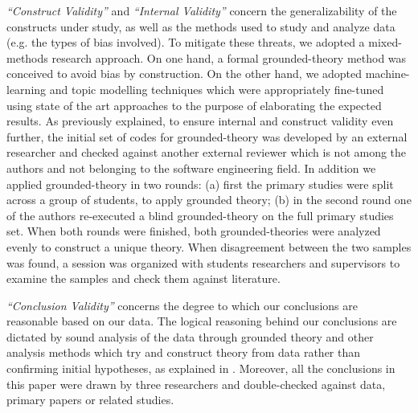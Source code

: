 \emph{``Construct Validity''} and \emph{``Internal Validity''} concern the generalizability of the constructs under study, as well as the methods used to study and analyze data (e.g. the types of bias involved). To mitigate these threats, we adopted a mixed-methods research approach. On one hand, a formal grounded-theory method was conceived to avoid bias by construction\cite{straussian,gt,gtmeth}. On the other hand, we adopted machine-learning and topic modelling techniques which were appropriately fine-tuned using state of the art approaches to the purpose of elaborating the expected results. As previously explained, to ensure internal and construct validity even further, the initial set of codes for grounded-theory was developed by an external researcher and checked against another external reviewer which is not among the authors and not belonging to the software engineering field. In addition we applied grounded-theory in two rounds: (a) first the primary studies were split across a group of students, to apply grounded theory; (b) in the second round one of the authors re-executed a blind grounded-theory on the full primary studies set. When both rounds were finished, both grounded-theories were analyzed evenly to construct a unique theory. When disagreement between the two samples was found, a session was organized with students researchers and supervisors to examine the samples and check them against literature.


\emph{``Conclusion Validity''} concerns the degree to which our conclusions are reasonable based on our data. The logical reasoning behind our conclusions are dictated by sound analysis of the data through grounded theory and other analysis methods which try and construct theory from data rather than confirming initial hypotheses, as explained in \cite{gtmeth,gtval}. Moreover, all the conclusions in this paper were drawn by three researchers and double-checked against data, primary papers or related studies. 